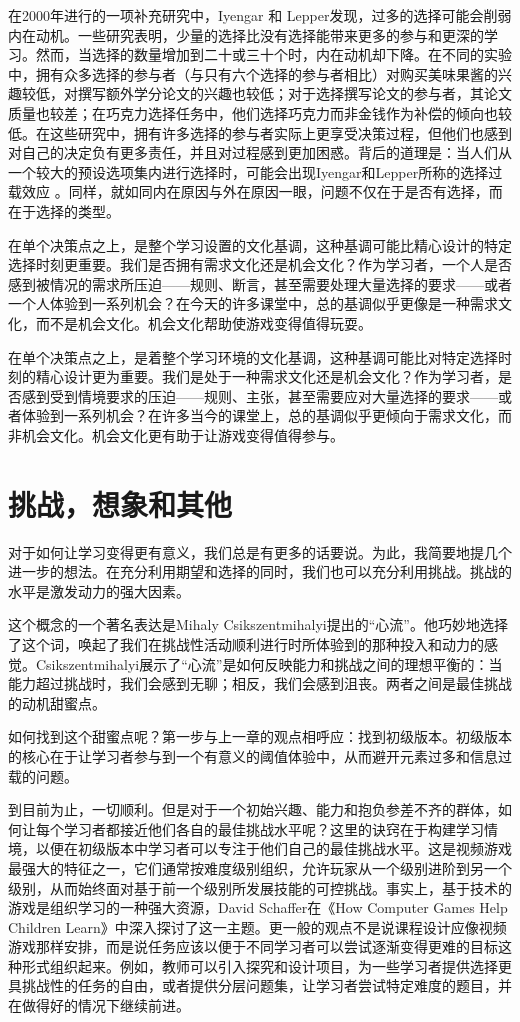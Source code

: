 在2000年进行的一项补充研究中，Iyengar 和 Lepper发现，过多的选择可能会削弱内在动机。一些研究表明，少量的选择比没有选择能带来更多的参与和更深的学习。然而，当选择的数量增加到二十或三十个时，内在动机却下降。在不同的实验中，拥有众多选择的参与者（与只有六个选择的参与者相比）对购买美味果酱的兴趣较低，对撰写额外学分论文的兴趣也较低；对于选择撰写论文的参与者，其论文质量也较差；在巧克力选择任务中，他们选择巧克力而非金钱作为补偿的倾向也较低。在这些研究中，拥有许多选择的参与者实际上更享受决策过程，但他们也感到对自己的决定负有更多责任，并且对过程感到更加困惑。背后的道理是：当人们从一个较大的预设选项集内进行选择时，可能会出现Iyengar和Lepper所称的选择过载效应 。同样，就如同内在原因与外在原因一眼，问题不仅在于是否有选择，而在于选择的类型。

在单个决策点之上，是整个学习设置的文化基调，这种基调可能比精心设计的特定选择时刻更重要。我们是否拥有需求文化还是机会文化？作为学习者，一个人是否感到被情况的需求所压迫——规则、断言，甚至需要处理大量选择的要求——或者一个人体验到一系列机会？在今天的许多课堂中，总的基调似乎更像是一种需求文化，而不是机会文化。机会文化帮助使游戏变得值得玩耍。

在单个决策点之上，是着整个学习环境的文化基调，这种基调可能比对特定选择时刻的精心设计更为重要。我们是处于一种需求文化还是机会文化？作为学习者，是否感到受到情境要求的压迫——规则、主张，甚至需要应对大量选择的要求——或者体验到一系列机会？在许多当今的课堂上，总的基调似乎更倾向于需求文化，而非机会文化。机会文化更有助于让游戏变得值得参与。

\section*{挑战，想象和其他}

对于如何让学习变得更有意义，我们总是有更多的话要说。为此，我简要地提几个进一步的想法。在充分利用期望和选择的同时，我们也可以充分利用挑战。挑战的水平是激发动力的强大因素。

这个概念的一个著名表达是Mihaly Csikszentmihalyi提出的“心流”。他巧妙地选择了这个词，唤起了我们在挑战性活动顺利进行时所体验到的那种投入和动力的感觉。Csikszentmihalyi展示了“心流”是如何反映能力和挑战之间的理想平衡的：当能力超过挑战时，我们会感到无聊；相反，我们会感到沮丧。两者之间是最佳挑战的动机甜蜜点。

如何找到这个甜蜜点呢？第一步与上一章的观点相呼应：找到初级版本。初级版本的核心在于让学习者参与到一个有意义的阈值体验中，从而避开元素过多和信息过载的问题。

到目前为止，一切顺利。但是对于一个初始兴趣、能力和抱负参差不齐的群体，如何让每个学习者都接近他们各自的最佳挑战水平呢？这里的诀窍在于构建学习情境，以便在初级版本中学习者可以专注于他们自己的最佳挑战水平。这是视频游戏最强大的特征之一，它们通常按难度级别组织，允许玩家从一个级别进阶到另一个级别，从而始终面对基于前一个级别所发展技能的可控挑战。事实上，基于技术的游戏是组织学习的一种强大资源，David Schaffer在《How Computer Games Help Children Learn》中深入探讨了这一主题。更一般的观点不是说课程设计应像视频游戏那样安排，而是说任务应该以便于不同学习者可以尝试逐渐变得更难的目标这种形式组织起来。例如，教师可以引入探究和设计项目，为一些学习者提供选择更具挑战性的任务的自由，或者提供分层问题集，让学习者尝试特定难度的题目，并在做得好的情况下继续前进。

